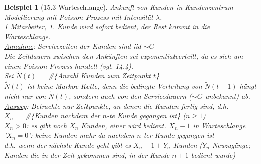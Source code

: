 \documentclass[a4paper,openany]{book}
\theoremstyle{mytheoremstyle}
\newtheorem*{bei}{Beispiel}
\theoremstyle{mytheoremstyle2}
\begin{document}
\begin{bei}[15.3 Warteschlange]%
  Ankunft von Kunden in Kundenzentrum \\
  Modellierung mit Poisson-Prozess mit Intensität $\lambda $. \\
  1 Mitarbeiter, 1. Kunde wird sofort bedient, der Rest kommt in die Warteschlange. \\
  \underline{Annahme}: Servicezeiten der Kunden sind iid $\sim G$\\
  Die Zeitdauern zwischen den Ankünften sei exponentialverteilt, da es sich um einen Poisson-Prozess handelt (vgl. 14.4). \\
  Sei $\tilde{N}(t)=$ \#\{Anzahl Kunden zum Zeitpunkt $t$\}\\
  $\tilde{N}(t)$ ist keine Markov-Kette, denn die bedingte Verteilung von $\tilde{N}(t+1)$ hängt nicht nur von $\tilde{N}(t)$, sondern auch von den Servicedauern ($\sim G$ unbekannt) ab.\\
  \underline{Ausweg}: Betrachte nur Zeitpunkte, an denen die Kunden fertig sind, d.h. \\
  $X_n=$ \#\{Kunden nachdem der $n$-te Kunde gegangen ist\} ($n \geq 1$) \\
  $X_n>0$: es gibt noch $X_n$ Kunden, einer wird bedient. $X _{n}-1$ in Warteschlange \\
    '$X_n=0$': keine Kunden mehr da nachdem $n$-ter Kunde gegangen ist \\
  d.h. wenn der nächste Kunde geht gibt es $X _{n}-1+Y_n$ Kunden ($Y_n$ Neuzugänge; Kunden die in der Zeit gekommen sind, in der Kunde $n+1$ bedient wurde)\\


\end{bei}
\end{document}
